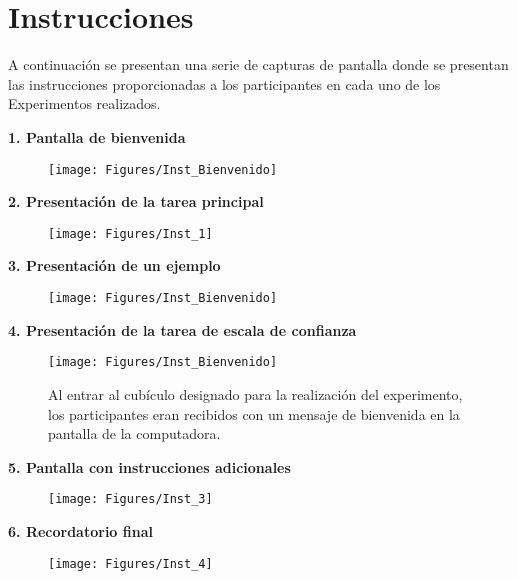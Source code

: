 
\chapter{Instrucciones} %

\label{App_Inst} %

A continuación se presentan una serie de capturas de pantalla donde se presentan las instrucciones proporcionadas a los participantes en cada uno de los Experimentos realizados.

\textbf{1. Pantalla de bienvenida}

\begin{figure}[th]
\centering
\texttt{[image: Figures/Inst\_Bienvenido]} 
\decoRule
\caption[Pantalla de Bienvenida]{}
\label{fig:csv}
\end{figure}


\textbf{2. Presentación de la tarea principal}

\begin{figure}[th]
\centering
\texttt{[image: Figures/Inst\_1]} 
\decoRule
\caption[Pantalla de Bienvenida]{}
\label{fig:csv}
\end{figure}

\textbf{3. Presentación de un ejemplo}

\begin{figure}[th]
\centering
\texttt{[image: Figures/Inst\_Bienvenido]} 
\decoRule
\caption[Pantalla de Bienvenida]{}
\label{fig:csv}
\end{figure}

\textbf{4. Presentación de la tarea de escala de confianza}

\begin{figure}[th]
\centering
\texttt{[image: Figures/Inst\_Bienvenido]} 
\decoRule
\caption[Pantalla de Bienvenida]{Al entrar al cubículo designado para la realización del experimento, los participantes eran recibidos con un mensaje de bienvenida en la pantalla de la computadora.}
\label{fig:csv}
\end{figure}

\textbf{5. Pantalla con instrucciones adicionales}

\begin{figure}[th]
\centering
\texttt{[image: Figures/Inst\_3]} 
\decoRule
\caption[Pantalla de Bienvenida]{}
\label{fig:csv}
\end{figure}

\textbf{6. Recordatorio final}

\begin{figure}[th]
\centering
\texttt{[image: Figures/Inst\_4]} 
\decoRule
\caption[Pantalla de Bienvenida]{}
\label{fig:csv}
\end{figure}
